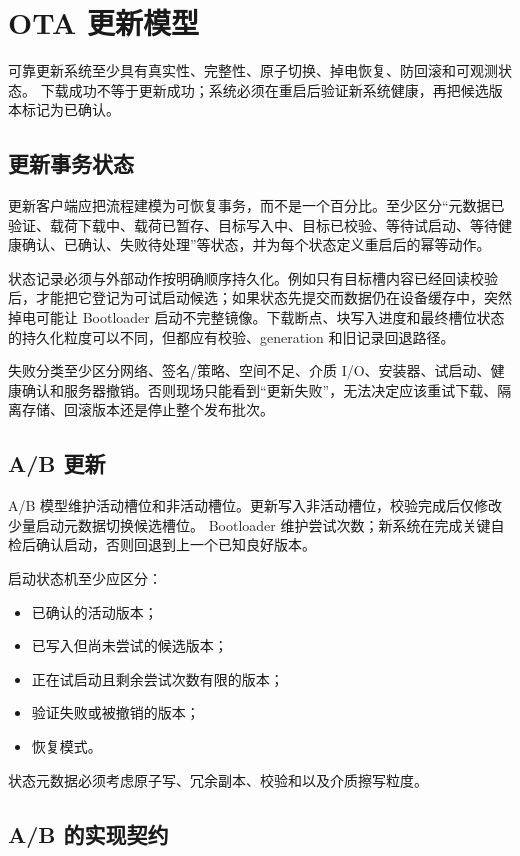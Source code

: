 \section{OTA 更新模型}

可靠更新系统至少具有真实性、完整性、原子切换、掉电恢复、防回滚和可观测状态。
下载成功不等于更新成功；系统必须在重启后验证新系统健康，再把候选版本标记为已确认。

\subsection{更新事务状态}

更新客户端应把流程建模为可恢复事务，而不是一个百分比。至少区分“元数据已验证、载荷下载中、载荷已暂存、目标写入中、目标已校验、等待试启动、等待健康确认、已确认、失败待处理”等状态，并为每个状态定义重启后的幂等动作。

状态记录必须与外部动作按明确顺序持久化。例如只有目标槽内容已经回读校验后，才能把它登记为可试启动候选；如果状态先提交而数据仍在设备缓存中，突然掉电可能让 Bootloader 启动不完整镜像。下载断点、块写入进度和最终槽位状态的持久化粒度可以不同，但都应有校验、generation 和旧记录回退路径。

失败分类至少区分网络、签名/策略、空间不足、介质 I/O、安装器、试启动、健康确认和服务器撤销。否则现场只能看到“更新失败”，无法决定应该重试下载、隔离存储、回滚版本还是停止整个发布批次。

\subsection{A/B 更新}

A/B 模型维护活动槽位和非活动槽位。更新写入非活动槽位，校验完成后仅修改少量启动元数据切换候选槽位。
Bootloader 维护尝试次数；新系统在完成关键自检后确认启动，否则回退到上一个已知良好版本。

启动状态机至少应区分：
\begin{itemize}
  \item 已确认的活动版本；
  \item 已写入但尚未尝试的候选版本；
  \item 正在试启动且剩余尝试次数有限的版本；
  \item 验证失败或被撤销的版本；
  \item 恢复模式。
\end{itemize}

状态元数据必须考虑原子写、冗余副本、校验和以及介质擦写粒度。

\subsection{A/B 的实现契约}

